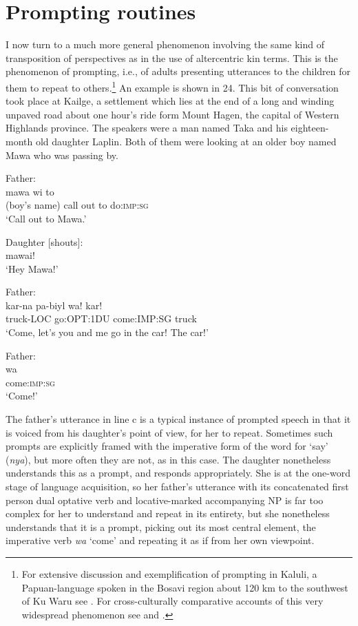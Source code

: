 \documentclass[output=paper]{langsci/langscibook}
\begin{document}
\section{Prompting routines}\label{s:ar5}

I now turn to a much more general phenomenon involving the same kind of transposition of perspectives as in the use of altercentric kin terms. This is the phenomenon of prompting, i.e., of adults presenting utterances to the children for them to repeat to others.\footnote{For extensive discussion and exemplification of prompting in Kaluli, a Papuan-language spoken in the Bosavi region about 120 km to the southwest of Ku Waru see \cite{Schieffelin1990}. For cross-culturally comparative accounts of this very widespread phenomenon see \cite{Demuth1986} and \cite{Moore2012}.} An example is shown in 24. This bit of conversation took place at Kailge, a settlement which lies at the end of a long and winding unpaved road about one hour’s ride form Mount Hagen, the capital of Western Highlands province. The speakers were a man named Taka and his eighteen-month old daughter Laplin. Both of them were looking at an older boy named Mawa who was passing by.

\begin{exe}
	\ex \label{ex:ar24}
	\begin{xlist}
	\ex Father:\label{ex:ar24a}\\
	\gll mawa wi to\\
	(boy’s name) call out to do:\textsc{imp}:\textsc{sg}\\
	\trans ‘Call out to Mawa.’ 	
	
	\ex Daughter [shouts]:\label{ex:ar24b}\\
	mawai!\\
	\trans ‘Hey Mawa!’
	
	\ex Father:\label{ex:ar24c}\\
	\gll kar-na pa-biyl wa! kar!\\
	truck-LOC go:OPT:1DU come:IMP:SG truck\\
	\trans ‘Come, let’s you and me go in the car! The car!’
	
	\ex Father:\label{ex:ar24d}\\
	\gll wa\\
	come:\textsc{imp}:\textsc{sg}\\
	\trans ‘Come!’
	\end{xlist}
\end{exe}

The father’s utterance in line c is a typical instance of prompted speech in that it is voiced from his daughter’s point of view, for her to repeat. Sometimes such prompts are explicitly framed with the imperative form of the word for ‘say’ (\textit{nya}), but more often they are not, as in this case. The daughter nonetheless understands this as a prompt, and responds appropriately. She is at the one-word stage of language acquisition, so her father’s utterance with its concatenated first person dual optative verb and locative-marked accompanying NP is far too complex for her to understand and repeat in its entirety, but she nonetheless understands that it is a prompt, picking out its most central element, the imperative verb \textit{wa} ‘come’ and repeating it as if from her own viewpoint.
\end{document}
